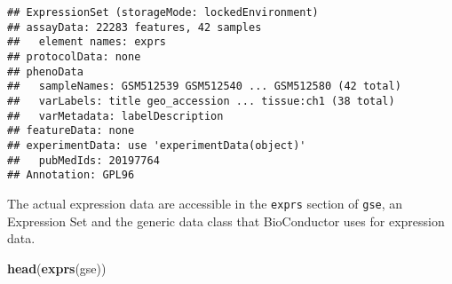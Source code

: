 \documentclass[
]{article}
\newenvironment{Shaded}{\begin{snugshade}}{\end{snugshade}}
\newcommand{\FunctionTok}[1]{\textcolor[rgb]{0.13,0.29,0.53}{\textbf{#1}}}
\newcommand{\NormalTok}[1]{#1}
\begin{document}
\begin{verbatim}
## ExpressionSet (storageMode: lockedEnvironment)
## assayData: 22283 features, 42 samples 
##   element names: exprs 
## protocolData: none
## phenoData
##   sampleNames: GSM512539 GSM512540 ... GSM512580 (42 total)
##   varLabels: title geo_accession ... tissue:ch1 (38 total)
##   varMetadata: labelDescription
## featureData: none
## experimentData: use 'experimentData(object)'
##   pubMedIds: 20197764 
## Annotation: GPL96
\end{verbatim}

The actual expression data are accessible in the \texttt{exprs} section
of \texttt{gse}, an Expression Set and the generic data class that
BioConductor uses for expression data.

\begin{Shaded}
\begin{Highlighting}[]
\FunctionTok{head}\NormalTok{(}\FunctionTok{exprs}\NormalTok{(gse)) }
\end{Highlighting}
\end{Shaded}
\end{document}
